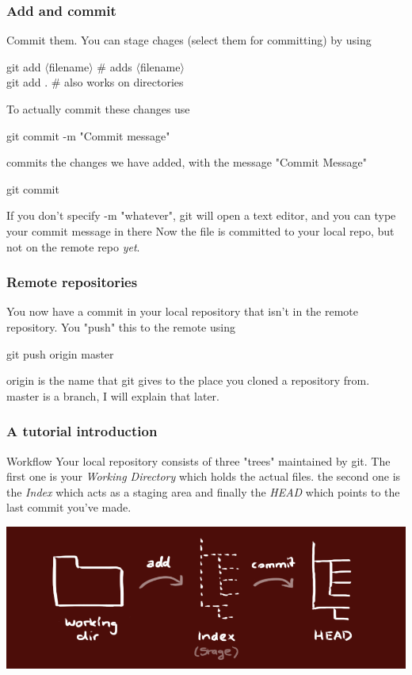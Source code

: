 \documentclass[xcolor=dvipsnames]{beamer}
\begin{document}
\begin{frame}
	\frametitle{Add and commit}
	Commit them.
	You can stage chages (select them for committing) by using
	\begin{block}{}
		git add $\langle$filename$\rangle$ \# adds $\langle$filename$\rangle$\\
		git add . \# also works on directories
	\end{block}
	To actually commit these changes use
	\begin{block}{}
		git commit -m "Commit message"
	\end{block}
	commits the changes we have added, with the message "Commit Message"\\
	
	\begin{block}{}	
		git commit
	\end{block}
 	If you don't specify -m "whatever", git will open a text editor, and you can type your commit message in there 
	Now the file is committed to your local repo, but not on the remote repo \emph{yet}.
\end{frame}

\begin{frame}
	\frametitle{Remote repositories}

	You now have a commit in your local repository that isn't in the remote repository.
	You "push" this to the remote using
	\begin{block}{}
		git push origin master
	\end{block}
	
	origin is the name that git gives to the place you cloned a repository from.\\
	master is a branch, I will explain that later.

\end{frame}

\begin{frame}
	\frametitle{A tutorial introduction}

	\begin{block}{Workflow}
		Your local repository consists of three "trees" maintained by git. The first one is 
		your \emph{Working Directory} which holds the actual files. the second one is the \emph{Index} which acts as a staging area and finally the \emph{HEAD} which points to the last commit you've made.
	\end{block}
	\begin{center}
		\includegraphics[scale=0.3]{trees.png}
	\end{center}
\end{frame}
\end{document}
